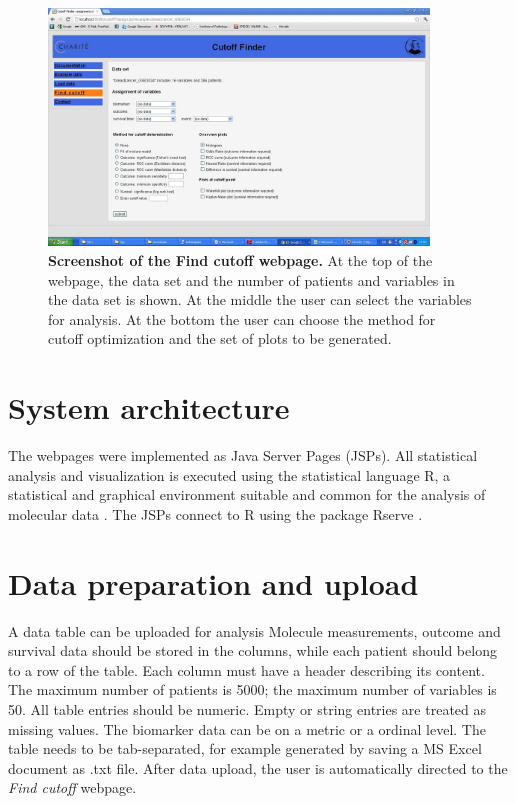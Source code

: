 \documentclass[12pt, a4paper]{article}
\begin{document}
\begin{figure}[t]
\centering
\includegraphics[width=0.9\textwidth]{fig1_screenshot_new}
\caption{\textbf{Screenshot of the Find cutoff webpage.} At the top of the webpage, the data set and the number of patients and variables in the data set is shown. At the middle the user can select the variables for analysis. At the bottom the user can choose the method for cutoff optimization and the set of plots to be generated.}
\label{fig:screenshot}
\end{figure}

\section{System architecture}
The webpages were implemented as Java Server Pages (JSPs).
All statistical analysis and visualization is executed using the statistical language R, a statistical and graphical environment suitable and common for the analysis of molecular data \cite{R}.
The JSPs connect to R using the package Rserve \cite{Rserve}.

\section{Data preparation and upload}
A data table can be uploaded for analysis
Molecule measurements, outcome and survival data should be stored in the columns, while each patient should belong to a row of the table.
Each column must have a header describing its content.
The maximum number of patients is 5000; the maximum number of variables is 50.
All table entries should be numeric.
Empty or string entries are treated as missing values.
The biomarker data can be on a metric or a ordinal level.
The table needs to be tab-separated, for example generated by saving a MS Excel document as .txt file.
After data upload, the user is automatically directed to the \emph{Find cutoff} webpage.
\end{document}
